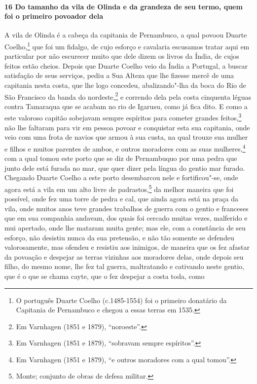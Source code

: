 \begin{linenumbers}
\paragraph{16 Do tamanho da vila de Olinda e da grandeza de seu termo, quem foi o primeiro
povoador dela} \quad
A vila de Olinda é a cabeça da capitania de Pernambuco, a qual povoou Duarte
Coelho,\footnote{ O português Duarte Coelho (c.1485-1554) foi o primeiro donatário da
Capitania de Pernambuco e chegou a essas terras em 1535.} que foi um fidalgo, de cujo
esforço e cavalaria escusamos tratar aqui em particular por não escurecer muito que dele
dizem os livros da Índia, de cujos feitos estão cheios. Depois que Duarte Coelho veio da
Índia a Portugal, a buscar satisfação de seus serviços, pediu a Sua Alteza que lhe fizesse
mercê de uma capitania nesta costa, que lhe logo concedeu, abalizando"-lha da boca do Rio
de São Francisco da banda do nordeste,\footnote{ Em Varnhagen (1851 e 1879),
``noroeste''.} e correndo dela pela costa cinquenta léguas contra Tamaraqua que se acabam
no rio de Igarusu, como já fica dito. E como a este valoroso capitão sobejavam sempre
espíritos para cometer grandes feitos,\footnote{ Em Varnhagen (1851 e 1879), ``sobravam
sempre espíritos''.} não lhe faltaram para vir em pessoa povoar e conquistar esta sua
capitania, onde veio com uma frota de navios que armou à sua custa, na qual trouxe sua
mulher e filhos e muitos parentes de ambos, e outros moradores com as suas
mulheres,\footnote{ Em Varnhagen (1851 e 1879), ``e outros moradores com a qual tomou''.}
com a qual tomou este porto que se diz de Pernambuquo por uma pedra que junto dele está
furada no mar, que quer dizer pela língua do gentio mar furado. Chegando Duarte Coelho a
este porto desembarcou nele e fortificou"-se, onde agora está a vila em um alto livre de
padrastos,\footnote{ Monte; conjunto de obras de defesa militar.} da melhor maneira que
foi possível, onde fez uma torre de pedra e cal, que ainda agora está na praça da vila,
onde muitos anos teve grandes trabalhos de guerra com o gentio e franceses que em sua
companhia andavam, dos quais foi cercado muitas vezes, malferido e mui apertado, onde lhe
mataram muita gente; mas ele, com a constância de seu esforço, não desistiu nunca da sua
pretensão, e não tão somente se defendeu valorosamente, mas ofendeu e resistiu aos
inimigos, de maneira que os fez afastar da povoação e despejar as terras vizinhas aos
moradores delas, onde depois seu filho, do mesmo nome, lhe fez tal guerra, maltratando e
cativando neste gentio, que é o que se chama cayte, que o fez despejar a costa toda, como

\end{linenumbers}
